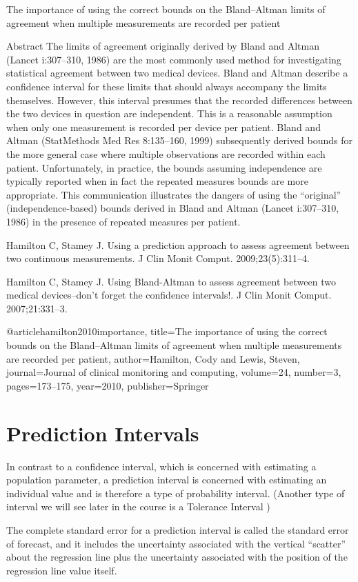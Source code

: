 The importance of using the correct bounds on the Bland–Altman limits of agreement when multiple measurements are recorded per patient

Abstract
The limits of agreement originally derived by Bland and Altman (Lancet i:307–310, 1986) are the most commonly used method for investigating statistical agreement between two medical devices. Bland and Altman describe a confidence interval for these limits that should always accompany the limits themselves. However, this interval presumes that the recorded differences between the two devices in question are independent. This is a reasonable assumption when only one measurement is recorded per device per patient. Bland and Altman (StatMethods Med Res 8:135–160, 1999) subsequently derived bounds for the more general case where multiple observations are recorded within each patient. Unfortunately, in practice, the bounds assuming independence are typically reported when in fact the repeated measures bounds are more appropriate. This communication illustrates the dangers of using the “original” (independence-based) bounds derived in Bland and Altman (Lancet i:307–310, 1986) in the presence of repeated measures per patient.





Hamilton C, Stamey J. Using a prediction approach to assess agreement between two continuous measurements. J Clin Monit Comput. 2009;23(5):311–4.

Hamilton C, Stamey J. Using Bland-Altman to assess agreement between two medical devices–don’t forget the confidence intervals!. J Clin Monit Comput. 2007;21:331–3.





@article{hamilton2010importance,
  title={The importance of using the correct bounds on the Bland--Altman limits of agreement when multiple measurements are recorded per patient},
  author={Hamilton, Cody and Lewis, Steven},
  journal={Journal of clinical monitoring and computing},
  volume={24},
  number={3},
  pages={173--175},
  year={2010},
  publisher={Springer}
}


\section{ Prediction Intervals }
 
In contrast to a confidence interval, which is concerned with estimating a population parameter, a 
prediction interval is concerned with estimating an individual value and is therefore a type of 
probability interval. (Another type of interval we will see later in the course is a Tolerance Interval ) 
 
The complete standard error for a prediction interval is called the standard error of forecast, and it 
includes the uncertainty associated with the vertical “scatter” about the regression line plus the 
uncertainty associated with the position of the regression line value itself. 

